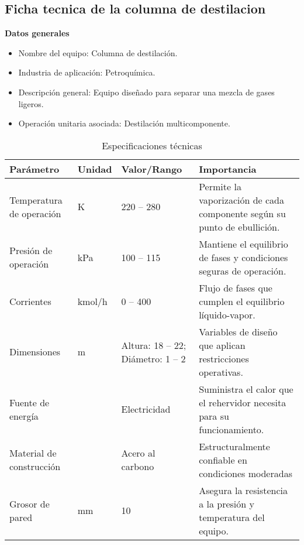 \subsection{Ficha tecnica de la columna de destilacion}

\textbf{Datos generales} \\
\begin{itemize}
    \item Nombre del equipo: Columna de destilación.
    \item Industria de aplicación: Petroquímica.
    \item Descripción general: Equipo diseñado para separar una mezcla de gases ligeros.
    \item Operación unitaria asociada: Destilación multicomponente.
\end{itemize}

\begin{table}[ht!]
    \centering
    \caption{Especificaciones técnicas}
    \begin{tabularx}{\linewidth}{|A{3.5cm}|A{2cm}|A{3cm}|B|}
        \hline
        \textbf{Parámetro}       & \textbf{Unidad} & \textbf{Valor/Rango}               & \textbf{Importancia}                                                     \\
        \hline
        Temperatura de operación & K               & 220 -- 280                         & Permite la vaporización de cada componente según su punto de ebullición. \\
        \hline
        Presión de operación     & kPa             & 100 -- 115                         & Mantiene el equilibrio de fases y condiciones seguras de operación.      \\
        \hline
        Corrientes               & kmol/h          & 0 -- 400                           & Flujo de fases que cumplen el equilibrio líquido-vapor.                  \\
        \hline
        Dimensiones              & m               & Altura: 18 -- 22; Diámetro: 1 -- 2 & Variables de diseño que aplican restricciones operativas.                \\
        \hline
        Fuente de energía        &                 & Electricidad                       & Suministra el calor que el rehervidor necesita para su funcionamiento.   \\
        \hline
        Material de construcción &                 & Acero al carbono                   & Estructuralmente confiable en condiciones moderadas                      \\
        \hline
        Grosor de pared          & mm              & 10                                 & Asegura la resistencia a la presión y temperatura del equipo.            \\
    \end{tabularx}
\end{table}

